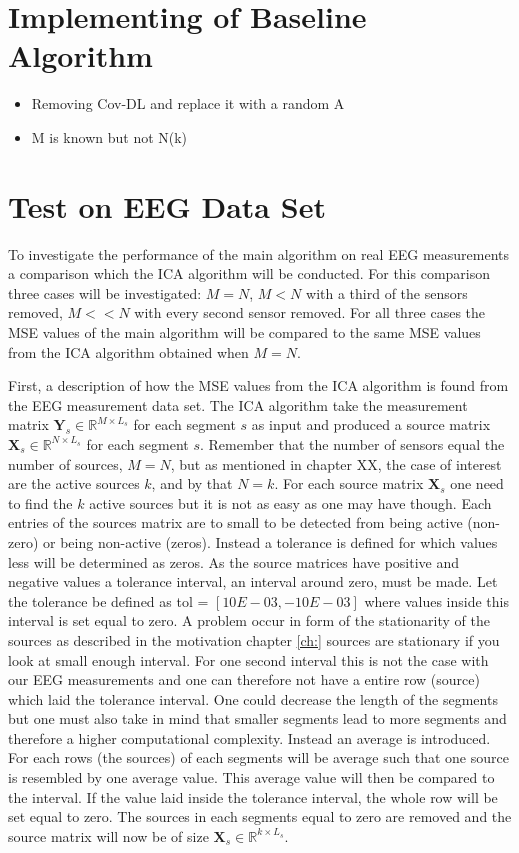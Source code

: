 \section{Implementing of Baseline Algorithm}
\begin{itemize}
\item Removing Cov-DL and replace it with a random A
\item M is known but not N(k)
\end{itemize}

\section{Test on EEG Data Set}
To investigate the performance of the main algorithm on real EEG measurements a comparison which the ICA algorithm will be conducted. For this comparison three cases will be investigated: $M = N$, $M < N$ with a third of the sensors removed, $M << N$ with every second sensor removed. For all three cases the MSE values of the main algorithm will be compared to the same MSE values from the ICA algorithm obtained when $M=N$.

First, a description of how the MSE values from the ICA algorithm is found from the EEG measurement data set.
The ICA algorithm take the measurement matrix $\mathbf{Y}_s \in \mathbb{R}^{M \times L_s}$ for each segment $s$ as input and produced a source matrix $\mathbf{X}_s \in \mathbb{R}^{N \times L_s}$ for each segment $s$. Remember that the number of sensors equal the number of sources, $M = N$, but as mentioned in chapter XX, the case of interest are the active sources $k$, and by that $N = k$. 
For each source matrix $\mathbf{X}_s$ one need to find the $k$ active sources but it is not as easy as one may have though. Each entries of the sources matrix are to small to be detected from being active (non-zero) or being non-active (zeros).
Instead a tolerance is defined for which values less will be determined as zeros. As the source matrices have positive and negative values a tolerance interval, an interval around zero, must be made. Let the tolerance be defined as tol = $[10E-03, -10E-03]$ where values inside this interval is set equal to zero.
A problem occur in form of the stationarity of the sources as described in the motivation chapter \ref{ch:} sources are stationary if you look at small enough interval. For one second interval this is not the case with our EEG measurements and one can therefore not have a entire row (source) which laid the tolerance interval. One could decrease the length of the segments but one must also take in mind that smaller segments lead to more segments and therefore a higher computational complexity. Instead an average is introduced. For each rows (the sources) of each segments will be average such that one source is resembled by one average value. This average value will then be compared to the interval. If the value laid inside the tolerance interval, the whole row will be set equal to zero. The sources in each segments equal to zero are removed and the source matrix will now be of size $\mathbf{X}_s \in \mathbb{R}^{k \times L_s}$.

